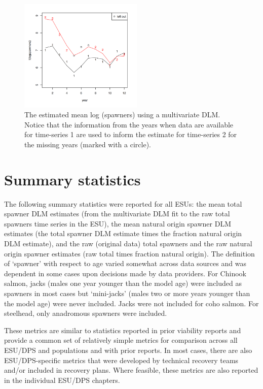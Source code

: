 \documentclass[
  letterpaper,
  oneside,
  open=any]{scrbook}
\begin{document}
\begin{figure}

{\centering \includegraphics[width=2.31in,height=\textheight]{content/../media/image7.png}

}

\caption{The estimated mean log (spawners) using a multivariate DLM.
Notice that the information from the years when data are available for
time-series 1 are used to inform the estimate for time-series 2 for the
missing years (marked with a circle).}

\end{figure}

\hypertarget{summary-statistics}{%
\section{Summary statistics}\label{summary-statistics}}

The following summary statistics were reported for all ESUs: the mean
total spawner DLM estimates (from the multivariate DLM fit to the raw
total spawners time series in the ESU), the mean natural origin spawner
DLM estimates (the total spawner DLM estimate times the fraction natural
origin DLM estimate), and the raw (original data) total spawners and the
raw natural origin spawner estimates (raw total times fraction natural
origin). The definition of `spawner' with respect to age varied somewhat
across data sources and was dependent in some cases upon decisions made
by data providers. For Chinook salmon, jacks (males one year younger
than the model age) were included as spawners in most cases but
`mini-jacks' (males two or more years younger than the model age) were
never included. Jacks were not included for coho salmon. For steelhead,
only anadromous spawners were included.

These metrics are similar to statistics reported in prior viability
reports and provide a common set of relatively simple metrics for
comparison across all ESU/DPS and populations and with prior reports. In
most cases, there are also ESU/DPS-specific metrics that were developed
by technical recovery teams and/or included in recovery plans. Where
feasible, these metrics are also reported in the individual ESU/DPS
chapters.
\end{document}
